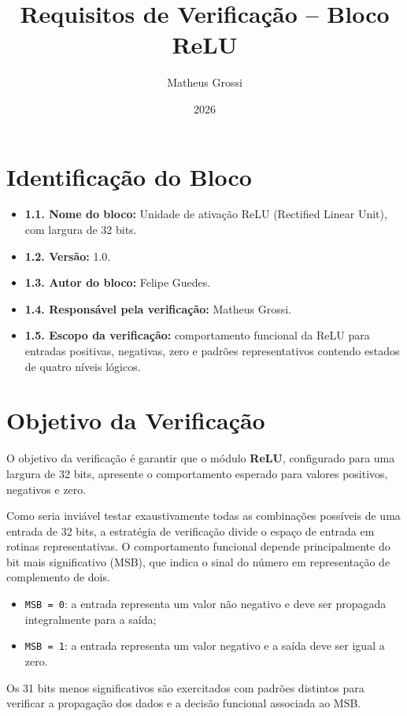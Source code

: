 \documentclass[12pt,a4paper]{article}
\title{Requisitos de Verificação -- Bloco ReLU}
\author{Matheus Grossi}
\date{2026}
\begin{document}
\maketitle

\vspace{1.5cm}
\section{Identificação do Bloco}
\begin{itemize}[label=\textbullet]
    \item \textbf{1.1. Nome do bloco:} Unidade de ativação ReLU (Rectified Linear Unit), com largura de 32 bits.
    \item \textbf{1.2. Versão:} 1.0.
    \item \textbf{1.3. Autor do bloco:} Felipe Guedes.
    \item \textbf{1.4. Responsável pela verificação:} Matheus Grossi.
    \item \textbf{1.5. Escopo da verificação:} comportamento funcional da ReLU para entradas positivas, negativas, zero e padrões representativos contendo estados de quatro níveis lógicos.
\end{itemize}

\section{Objetivo da Verificação}
O objetivo da verificação é garantir que o módulo \textbf{ReLU}, configurado para uma largura de 32 bits, apresente o comportamento esperado para valores positivos, negativos e zero.

Como seria inviável testar exaustivamente todas as combinações possíveis de uma entrada de 32 bits, a estratégia de verificação divide o espaço de entrada em rotinas representativas. O comportamento funcional depende principalmente do bit mais significativo (MSB), que indica o sinal do número em representação de complemento de dois.

\begin{itemize}
    \item \texttt{MSB = 0}: a entrada representa um valor não negativo e deve ser propagada integralmente para a saída;
    \item \texttt{MSB = 1}: a entrada representa um valor negativo e a saída deve ser igual a zero.
\end{itemize}

Os 31 bits menos significativos são exercitados com padrões distintos para verificar a propagação dos dados e a decisão funcional associada ao MSB.
\end{document}
